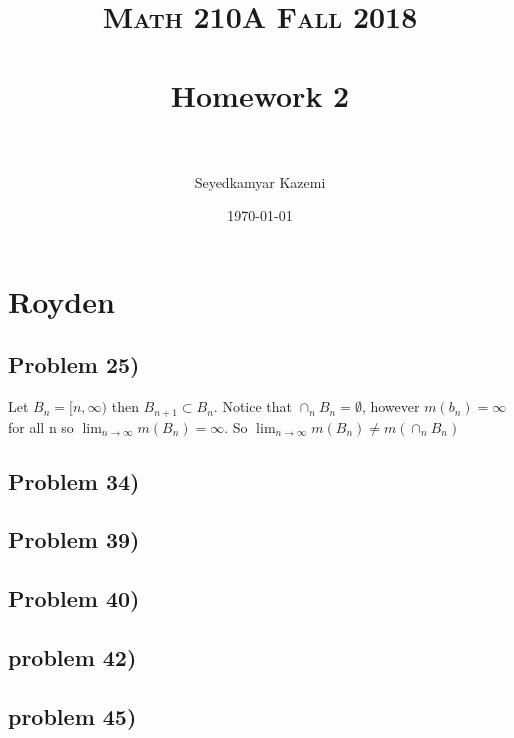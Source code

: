 \documentclass[paper=letter, fontsize=11pt]{scrartcl} %
\title{	
\normalfont \normalsize 
\textsc{Math 210A Fall 2018} \\ [25pt] %
\horrule{0.5pt} \\[0.4cm] %
\huge Homework 2\\ %
\horrule{2pt} \\[0.5cm] %
}
\author{Seyedkamyar Kazemi} %
\date{\normalsize\today} %
\begin{document}
\maketitle
\section{Royden}
\subsection{Problem 25)}
Let $B_n=[n,\infty)$ then $B_{n+1} \subset B_n$. Notice that $\cap_n B_n = \emptyset$, however $m(b_n) = \infty$ for all n so $\lim_{n \rightarrow \infty} m(B_n)=\infty$. So $\lim_{n \rightarrow \infty} m(B_n) \not = m(\cap_n B_n)$  
\subsection{Problem 34)}

\subsection{Problem 39)}
\subsection{Problem 40)}
\subsection{problem 42)}
\subsection{problem 45)}
\end{document}
